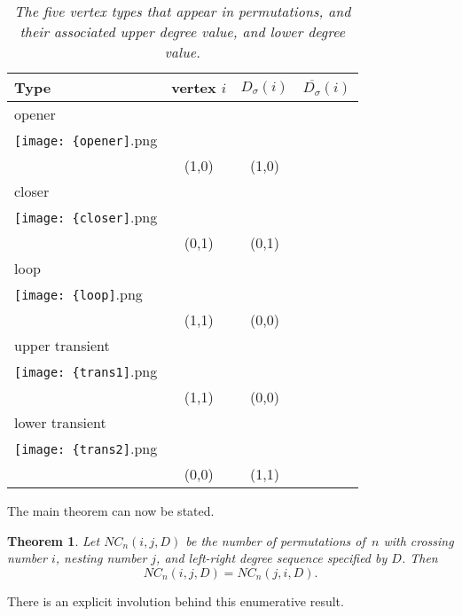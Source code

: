 \documentclass{amsart}
\newtheorem{theorem}{Theorem}
\begin{document}
\begin{table}\label{tab:vtypes}
\center
\begin{tabular}{|l|c|c|l|}\hline
{\bf Type} & {\bf vertex $i$} & $D_{\sigma}(i)$ &$\overline{D_{\sigma}}(i)$ \\\hline
opener & {
\begin{minipage}[c]{0.6cm}\center\mbox{}\smallskip\\\texttt{[image: \{opener]}.png}\\\mbox{}\end{minipage}} &(1,0) & (1,0)\\ \hline
closer   & {
\begin{minipage}[c]{0.6cm}\center\mbox{}\smallskip\\\texttt{[image: \{closer]}.png}\\\mbox{}\end{minipage}}  &(0,1) & (0,1)\\ \hline
loop  & {
\begin{minipage}[c]{0.6cm}\center\mbox{}\smallskip\\\texttt{[image: \{loop]}.png}\\\mbox{}\end{minipage}} & (1,1) &  (0,0)\\\hline
 upper transient & {
\begin{minipage}[c]{0.6cm}\center\mbox{}\smallskip\\\texttt{[image: \{trans1]}.png}\\\mbox{}\end{minipage}} &(1,1) &  (0,0)\\ \hline
lower transient & {
\begin{minipage}[c]{0.6cm}\center\mbox{}\smallskip\\\texttt{[image: \{trans2]}.png}\\\mbox{}\end{minipage}} &(0,0) &  (1,1)\\ \hline
\end{tabular}

\smallskip
\caption{\it The five vertex types that appear in permutations, and their associated upper degree value, and lower degree value. }

\end{table}
The main theorem can now be stated. 

\begin{theorem} \label{thm:main}
Let $NC_n(i,j, D)$ be the number of permutations of~$n$ with crossing number $i$, nesting number $j$, and left-right degree sequence specified by $D$. Then 
\begin{equation}
NC_n(i,j, D)=NC_n(j,i, D).
\end{equation}
\end{theorem}
There is an explicit involution behind this enumerative result. 
\end{document}
